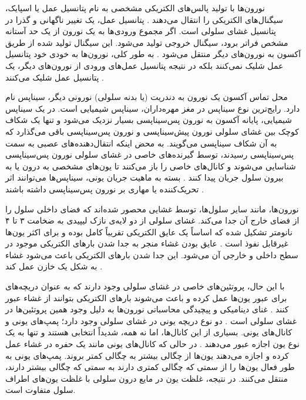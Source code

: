نورون‌ها با تولید پالس‌های الکتریکی مشخصی به نام پتانسیل عمل یا اسپایک، سیگنال‌های الکتریکی را انتقال می‌دهند
\cite{dayan2001}.
پتانسیل عمل، یک تغییر ناگهانی و گذرا در پتانسیل غشای سلولی است.
اگر مجموع ورودی‌ها به یک نورون از یک حد آستانه مشخص فراتر برود، سیگنال خروجی تولید می‌شود.
این سیگنال تولید شده از طریق آکسون به نورون‌های دیگر منتقل می‌شود
\cite{gerstner2002}.
به طور کلی، نورون‌ها به خودی خود پتانسیل عمل شلیک نمی‌کنند بلکه در نتیجه پتانسیل عمل‌های ورودی از نورون‌های دیگر، یک پتانسیل عمل شلیک می‌کنند
\cite{izhikevich2006}.

محل تماس آکسون یک نورون به دندریت (یا بدنه سلولی) نورونی دیگر، سیناپس نام دارد.
رایج‌ترین نوع سیناپس در مغز مهره‌داران، سیناپس شیمیایی است.
در یک سیناپس شیمیایی، پایانه آکسون به نورون پس‌سیناپسی بسیار نزدیک می‌شود و تنها یک شکاف کوچک بین غشای سلولی نورون پیش‌سیناپسی و نورون پس‌سیناپسی باقی می‌گذارد که به آن شکاف سیناپسی می‌گویند.
به محض اینکه انتقال‌دهنده‌های عصبی به سمت پس‌سیناپسی رسیدند، توسط گیرنده‌های خاصی در غشای سلولی نورون پس‌سیناپسی شناسایی می‌شوند و کانال‌های خاصی را باز می‌کنند تا یون‌های مشخصی به درون یا به بیرون سلول جریان پیدا کنند
\cite{gerstner2002}.
بسته به ماهیت جریان یونی، سیناپس‌ها می‌توانند اثر تحریک‌کننده یا مهاری بر نورون پس‌سیناپسی داشته باشند
\cite{dayan2001}.

نورون‌ها، مانند سایر سلول‌ها، توسط غشایی محصور شده‌اند که فضای داخلی سلول را از فضای خارج آن جدا می‌کند.
غشای سلولی از دو لایه‌ی نازک لیپیدی به ضخامت ۳ تا ۴ نانومتر تشکیل شده که اساساً یک عایق الکتریکی تقریباً کامل بوده و برای اکثر یون‌ها غیرقابل نفوذ است
\cite{gerstner2002}.
عایق بودن غشاء منجر به جدا شدن بارهای الکتریکی موجود در سطح داخلی و خارجی آن می‌شود.
این جدا شدن بار‌های الکتریکی باعث می‌شود غشاء به شکل یک خازن عمل کند
\cite{dayan2001}.

با این حال، پروتئین‌های خاصی در غشای سلولی وجود دارند که به عنوان دریچه‌های برای عبور یون‌ها عمل کرده و باعث می‌شوند بارهای الکتریکی بتوانند از غشاء عبور کنند
\cite{gerstner2002}.
غنای دینامیکی و پیچیدگی محاسباتی نورون‌ها به دلیل وجود همین پروتئین‌ها در غشای سلولی است
\cite{graben2008}.
دو نوع دریچه یونی در غشای سلولی وجود دارد؛
پمپ‌های یونی و کانال‌های یونی.
بسیاری از این کانال‌ها، اما نه همه، شدیداً انتخابی هستند و تنها به یک نوع یون اجازه عبور می‌دهند
\cite{dayan2001}.
در حالی که کانال‌های یونی مانند یک حفره در غشاء عمل کرده و اجازه می‌دهند یون‌ها از چگالی بیشتر به چگالی کمتر بروند.
پمپ‌های یونی به طور فعال یون‌ها را از سمتی که چگالی کمتری دارند به سمتی که چگالی بیشتر دارند، منتقل می‌کنند.
در نتیجه، غلظت یون در مایع درون سلولی با غلظت یون‌های اطراف سلول متفاوت است.

